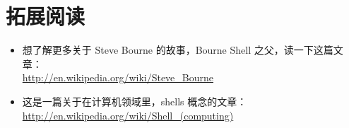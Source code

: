 \section{拓展阅读} %
\label{sec:拓展阅读2}

\begin{itemize}
	\item 想了解更多关于 Steve Bourne 的故事，Bourne Shell 之父，读一下这篇文章：\\
	\url{http://en.wikipedia.org/wiki/Steve_Bourne}\\
	\item 这是一篇关于在计算机领域里，shells 概念的文章：\\
	\url{http://en.wikipedia.org/wiki/Shell_(computing)}\\
\end{itemize}
